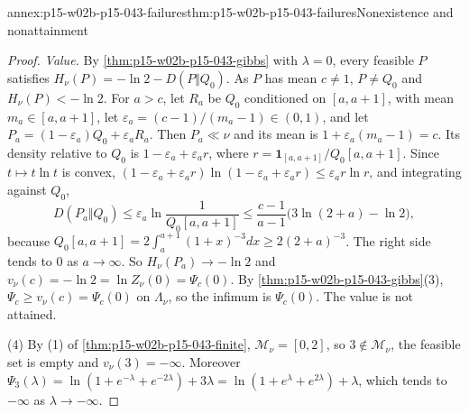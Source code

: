 \begin{annexitem}{annex:p15-w02b-p15-043-failures}{thm:p15-w02b-p15-043-failures}{Nonexistence and nonattainment}
\begin{proof}
\emph{Value.} By \cref{thm:p15-w02b-p15-043-gibbs} with \(\lambda=0\), every
feasible \(P\) satisfies \(H_\nu(P)=-\ln2-D(P\Vert Q_0)\). As \(P\) has mean
\(c\neq1\), \(P\neq Q_0\) and \(H_\nu(P)<-\ln2\). For \(a>c\), let \(R_a\) be
\(Q_0\) conditioned on \([a,a+1]\), with mean \(m_a\in[a,a+1]\), let
\(\varepsilon_a=(c-1)/(m_a-1)\in(0,1)\), and let
\(P_a=(1-\varepsilon_a)Q_0+\varepsilon_aR_a\). Then \(P_a\ll\nu\) and its mean is
\(1+\varepsilon_a(m_a-1)=c\). Its density relative to \(Q_0\) is
\(1-\varepsilon_a+\varepsilon_ar\), where
\(r=\mathbf 1_{[a,a+1]}/Q_0[a,a+1]\). Since \(t\mapsto t\ln t\) is convex,
\((1-\varepsilon_a+\varepsilon_ar)\ln(1-\varepsilon_a+\varepsilon_ar)\leq
\varepsilon_ar\ln r\), and integrating against \(Q_0\),
\[
 D(P_a\Vert Q_0)\leq\varepsilon_a\ln\frac1{Q_0[a,a+1]}
 \leq\frac{c-1}{a-1}\bigl(3\ln(2+a)-\ln2\bigr),
\]
because \(Q_0[a,a+1]=2\int_a^{a+1}(1+x)^{-3}dx\geq2(2+a)^{-3}\). The right side
tends to \(0\) as \(a\to\infty\). So \(H_\nu(P_a)\to-\ln2\) and
\(v_\nu(c)=-\ln2=\ln Z_\nu(0)=\Psi_c(0)\). By
\cref{thm:p15-w02b-p15-043-gibbs}(3), \(\Psi_c\geq v_\nu(c)=\Psi_c(0)\) on
\(\Lambda_\nu\), so the infimum is \(\Psi_c(0)\). The value is not attained.

(4) By (1) of \cref{thm:p15-w02b-p15-043-finite}, \(\mathcal M_\nu=[0,2]\), so
\(3\notin\mathcal M_\nu\), the feasible set is empty and
\(v_\nu(3)=-\infty\). Moreover
\(\Psi_3(\lambda)=\ln(1+e^{-\lambda}+e^{-2\lambda})+3\lambda
 =\ln(1+e^{\lambda}+e^{2\lambda})+\lambda\), which tends to \(-\infty\) as
\(\lambda\to-\infty\).
\end{proof}
\end{annexitem}

